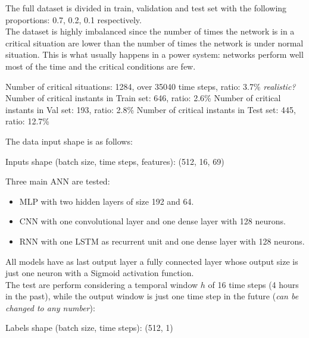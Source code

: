 The full dataset is divided in train, validation and test set with the following proportions: 0.7, 0.2, 0.1 respectively. \\

The dataset is highly imbalanced since the number of times the network is in a critical situation are lower than the number of times the network is under normal situation. This is what usually happens in a power system: networks perform well most of the time and the critical conditions are few.

\begin{algorithm}[H]
    \State Number of critical situations: 1284, over 35040 time steps, ratio: 3.7\% \emph{realistic?}
    \State Number of critical instants in Train set: 646, ratio: 2.6\%
    \State Number of critical instants in Val set: 193, ratio: 2.8\%
    \State Number of critical instants in Test set: 445, ratio: 12.7\%
\end{algorithm}

The data input shape is as follows:

\begin{algorithm}[H]
    \State Inputs shape (batch size, time steps, features): (512, 16, 69)
\end{algorithm}

Three main \gls{ANN} are tested:
\begin{itemize}
    \item \gls{MLP} with two hidden layers of size 192 and 64.
    \item \gls{CNN} with one convolutional layer and one dense layer with 128 neurons.
    \item \gls{RNN} with one \gls{LSTM} as recurrent unit and one dense layer with 128 neurons.
\end{itemize}
All models have as last output layer a fully connected layer whose output size is just one neuron with a Sigmoid activation function.\\

The test are perform considering a temporal window $h$ of 16 time steps (4 hours in the past), while the output window is just one time step in the future (\emph{can be changed to any number}):
\begin{algorithm}[H]
    \State Labels shape (batch size, time steps): (512, 1)
\end{algorithm}


